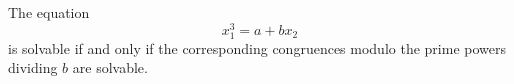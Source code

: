 \begin{proposition}
    The equation
\[
    x_1^3=a+bx_2
\]
    is solvable if and only if the corresponding congruences modulo the prime powers dividing $b$ are solvable.
\end{proposition}
